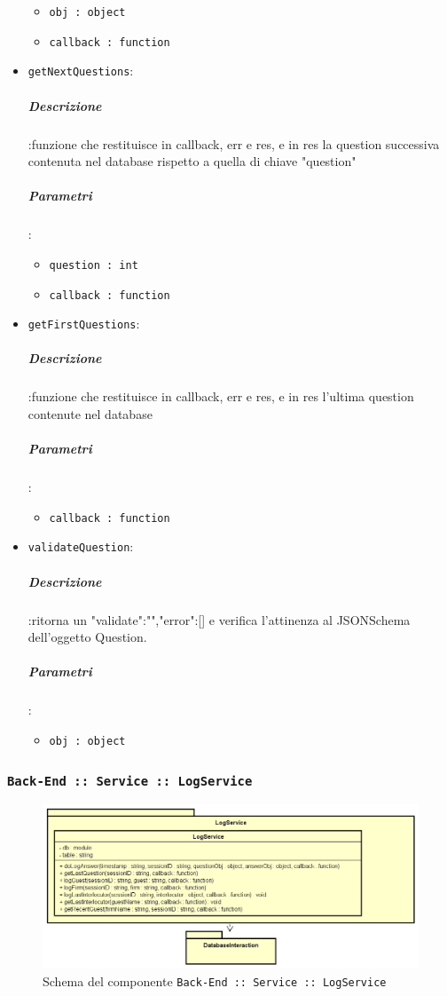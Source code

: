 \documentclass[../DefinizioneDiProdotto_v3.0.0.tex]{subfiles}
\begin{document}
\begin{itemize}
\begin{itemize}
	\item \texttt{obj : object}
	\item \texttt{callback : function}
\end{itemize}
\item \texttt{getNextQuestions}:
\subparagraph{Descrizione}:funzione che restituisce in callback, err e res, e in res la  question successiva contenuta nel database rispetto a quella di chiave "question"
\subparagraph{Parametri}:
\begin{itemize}
	\item \texttt{question : int}
	\item \texttt{callback : function}
\end{itemize}
\item \texttt{getFirstQuestions}:
\subparagraph{Descrizione}:funzione che restituisce in callback, err e res, e in res l'ultima question contenute nel database
\subparagraph{Parametri}:
\begin{itemize}
	\item \texttt{callback : function}
\end{itemize}
\item \texttt{validateQuestion}:
\subparagraph{Descrizione}:ritorna un {"validate":"","error":[]}  e verifica l'attinenza al JSONSchema dell'oggetto Question.
\subparagraph{Parametri}:
\begin{itemize}
	\item \texttt{obj : object}
\end{itemize}
\end{itemize}
\newpage
\subsubsection{\texttt{Back-End :: Service :: LogService}}
\begin{figure}[!h]
	\centering
	\includegraphics[width=\textwidth]{Architettura/Back-End/Service/LogService.png}
	\caption{Schema del componente \texttt{Back-End :: Service :: LogService}}
\end{figure}
\end{document}
